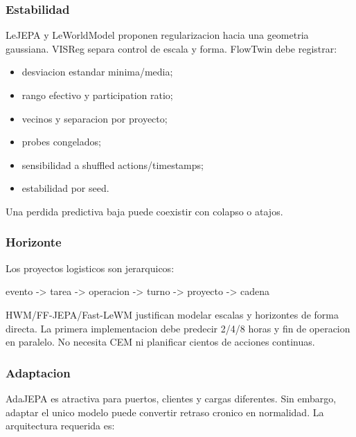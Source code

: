 \documentclass[
  spanish,
  10pt,
  a4paper,
]{article}
\newenvironment{Shaded}{}{}
\newcommand{\NormalTok}[1]{#1}
\providecommand{\tightlist}{%
  \setlength{\itemsep}{0pt}\setlength{\parskip}{0pt}}
\begin{document}
\subsubsection{Estabilidad}\label{estabilidad}

LeJEPA y LeWorldModel proponen regularizacion hacia una geometria
gaussiana. VISReg separa control de escala y forma. FlowTwin debe
registrar:

\begin{itemize}
\tightlist
\item
  desviacion estandar minima/media;
\item
  rango efectivo y participation ratio;
\item
  vecinos y separacion por proyecto;
\item
  probes congelados;
\item
  sensibilidad a shuffled actions/timestamps;
\item
  estabilidad por seed.
\end{itemize}

Una perdida predictiva baja puede coexistir con colapso o atajos.

\subsubsection{Horizonte}\label{horizonte}

Los proyectos logisticos son jerarquicos:

\begin{Shaded}
\begin{Highlighting}[]
\NormalTok{evento {-}\textgreater{} tarea {-}\textgreater{} operacion {-}\textgreater{} turno {-}\textgreater{} proyecto {-}\textgreater{} cadena}
\end{Highlighting}
\end{Shaded}

HWM/FF-JEPA/Fast-LeWM justifican modelar escalas y horizontes de forma
directa. La primera implementacion debe predecir 2/4/8 horas y fin de
operacion en paralelo. No necesita CEM ni planificar cientos de acciones
continuas.

\subsubsection{Adaptacion}\label{adaptacion}

AdaJEPA es atractiva para puertos, clientes y cargas diferentes. Sin
embargo, adaptar el unico modelo puede convertir retraso cronico en
normalidad. La arquitectura requerida es:
\end{document}
